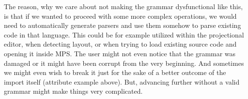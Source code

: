 The reason, why we care about not making the grammar dysfunctional like this, is that if we wanted to proceed with some more complex operations, we would need to automatically generate parsers and use them somehow to parse existing code in that language. This could be for example utilized within the projectional editor, when detecting layout, or when trying to load existing source code and opening it inside MPS. The user might not even notice that the grammar was damaged or it might have been corrupt from the very beginning. And sometimes we might even wish to break it just for the sake of a better outcome of the import itself (attribute example above). But, advancing further without a valid grammar might make things very complicated.
